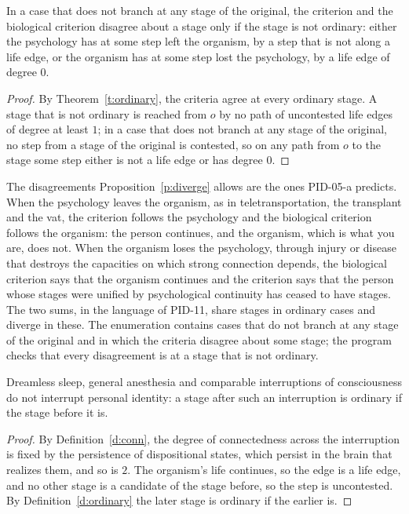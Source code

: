 \documentclass{situationist-preprint}
\begin{document}
\begin{proposition}\label{p:diverge}
In a case that does not branch at any stage of the original, the criterion and the biological criterion disagree about a stage only if the stage is not ordinary: either the psychology has at some step left the organism, by a step that is not along a life edge, or the organism has at some step lost the psychology, by a life edge of degree $0$.
\end{proposition}

\begin{proof}
By Theorem~\ref{t:ordinary}, the criteria agree at every ordinary stage. A stage that is not ordinary is reached from $o$ by no path of uncontested life edges of degree at least $1$; in a case that does not branch at any stage of the original, no step from a stage of the original is contested, so on any path from $o$ to the stage some step either is not a life edge or has degree $0$.
\end{proof}

The disagreements Proposition~\ref{p:diverge} allows are the ones PID-05-a predicts. When the psychology leaves the organism, as in teletransportation, the transplant and the vat, the criterion follows the psychology and the biological criterion follows the organism: the person continues, and the organism, which is what you are, does not. When the organism loses the psychology, through injury or disease that destroys the capacities on which strong connection depends, the biological criterion says that the organism continues and the criterion says that the person whose stages were unified by psychological continuity has ceased to have stages. The two sums, in the language of PID-11, share stages in ordinary cases and diverge in these. The enumeration contains \stbiodisN{} cases that do not branch at any stage of the original and in which the criteria disagree about some stage; the program checks that every disagreement is at a stage that is not ordinary.

\begin{proposition}\label{p:sleep}
Dreamless sleep, general anesthesia and comparable interruptions of consciousness do not interrupt personal identity: a stage after such an interruption is ordinary if the stage before it is.
\end{proposition}

\begin{proof}
By Definition~\ref{d:conn}, the degree of connectedness across the interruption is fixed by the persistence of dispositional states, which persist in the brain that realizes them, and so is $2$. The organism's life continues, so the edge is a life edge, and no other stage is a candidate of the stage before, so the step is uncontested. By Definition~\ref{d:ordinary} the later stage is ordinary if the earlier is.
\end{proof}
\end{document}
